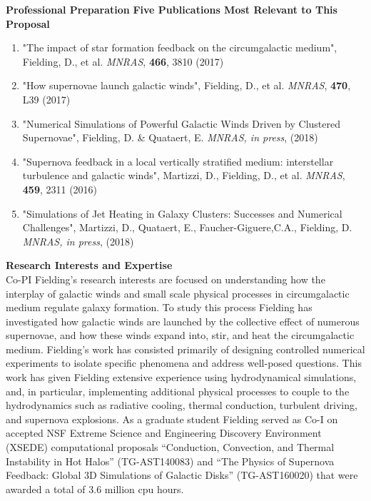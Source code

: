 \documentclass[11pt,letterpaper,english]{article}
\begin{document}
\begin{flushleft} {\bf Professional Preparation}
\vspace{.04in}
{\bf Five Publications Most Relevant to This Proposal}
\vspace{-6pt}
\begin{enumerate} \itemsep1pt \parskip0pt 
\item "The impact of star formation feedback on the circumgalactic medium", Fielding, D., et al. \textit{MNRAS}, {\bf 466}, 3810 (2017)\\ 
\item "How supernovae launch galactic winds", Fielding, D., et al. \textit{MNRAS}, {\bf 470}, L39 (2017)\\ 
\item "Numerical Simulations of Powerful Galactic Winds Driven by Clustered Supernovae", Fielding, D. \& Quataert, E. \textit{MNRAS, in press}, (2018)\\ 
\item "Supernova feedback in a local vertically stratified medium: interstellar turbulence and galactic winds", Martizzi, D.,  Fielding, D., et al. \textit{MNRAS}, {\bf 459}, 2311 (2016)\\ 
\item "Simulations of Jet Heating in Galaxy Clusters: Successes and Numerical Challenges", Martizzi, D., Quataert, E., Faucher-Giguere,C.A., Fielding, D. \textit{MNRAS, in press}, (2018)\\ 
\end{enumerate} 

\vspace{-6pt}
{\bf Research Interests and Expertise\\}
{\parindent 16pt
Co-PI Fielding's research interests are focused on understanding how the interplay of galactic winds and small scale physical processes in circumgalactic medium regulate galaxy formation. To study this process Fielding has investigated how galactic winds are launched by the collective effect of numerous supernovae, and how these winds expand into, stir, and heat the circumgalactic medium.
Fielding's work has consisted primarily of designing controlled numerical experiments to isolate specific phenomena and address well-posed questions. This work has given Fielding extensive experience using hydrodynamical simulations, and, in particular, implementing additional physical processes to couple to the hydrodynamics such as radiative cooling, thermal conduction, turbulent driving, and supernova explosions. As a graduate student Fielding served as Co-I on accepted NSF Extreme Science and Engineering Discovery Environment (XSEDE) computational proposals ``Conduction, Convection, and Thermal Instability in Hot Halos'' (TG-AST140083) and ``The Physics of Supernova Feedback: Global 3D Simulations of Galactic Disks'' (TG-AST160020) that were awarded a total of 3.6 million cpu hours. }


\end{flushleft}
\end{document}
